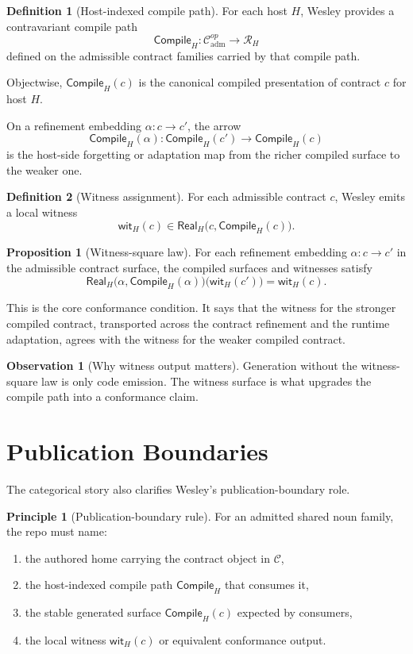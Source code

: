 \documentclass[11pt]{article}
\newcommand{\Ctr}{\mathcal{C}}
\newcommand{\RHost}[1]{\mathcal{R}_{#1}}
\newcommand{\Compile}{\mathsf{Compile}}
\newcommand{\Real}{\mathsf{Real}}
\theoremstyle{definition}
\newtheorem{definition}{Definition}
\newtheorem{observation}{Observation}
\newtheorem{principle}{Principle}
\newtheorem{proposition}{Proposition}
\begin{document}
\begin{definition}[Host-indexed compile path]
For each host $H$, Wesley provides a contravariant compile path
\[
\Compile_H : \Ctr_{\mathrm{adm}}^{op} \to \RHost{H}
\]
defined on the admissible contract families carried by that compile path.
\end{definition}

Objectwise, $\Compile_H(c)$ is the canonical compiled presentation of contract
$c$ for host $H$.

On a refinement embedding $\alpha : c \to c'$, the arrow
\[
\Compile_H(\alpha) : \Compile_H(c') \to \Compile_H(c)
\]
is the host-side forgetting or adaptation map from the richer compiled surface
to the weaker one.

\begin{definition}[Witness assignment]
For each admissible contract $c$, Wesley emits a local witness
\[
\mathsf{wit}_H(c) \in \Real_H\bigl(c,\Compile_H(c)\bigr).
\]
\end{definition}

\begin{proposition}[Witness-square law]
For each refinement embedding $\alpha : c \to c'$ in the admissible contract
surface, the compiled surfaces and witnesses satisfy
\[
\Real_H\!\bigl(\alpha,\Compile_H(\alpha)\bigr)\bigl(\mathsf{wit}_H(c')\bigr)
= \mathsf{wit}_H(c).
\]
\end{proposition}

This is the core conformance condition. It says that the witness for the
stronger compiled contract, transported across the contract refinement and the
runtime adaptation, agrees with the witness for the weaker compiled contract.

\begin{observation}[Why witness output matters]
Generation without the witness-square law is only code emission. The witness
surface is what upgrades the compile path into a conformance claim.
\end{observation}

\section{Publication Boundaries}

The categorical story also clarifies Wesley's publication-boundary role.

\begin{principle}[Publication-boundary rule]
For an admitted shared noun family, the repo must name:
\begin{enumerate}[leftmargin=2em]
\item the authored home carrying the contract object in $\Ctr$,
\item the host-indexed compile path $\Compile_H$ that consumes it,
\item the stable generated surface $\Compile_H(c)$ expected by consumers,
\item the local witness $\mathsf{wit}_H(c)$ or equivalent conformance output.
\end{enumerate}
\end{principle}
\end{document}
